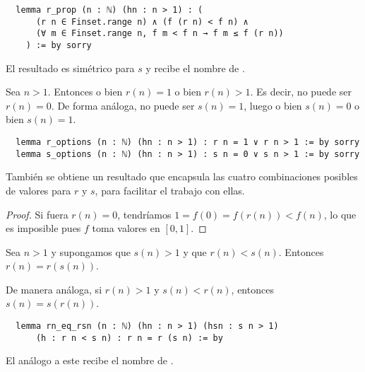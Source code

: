 \begin{lstlisting}
  lemma r_prop (n : ℕ) (hn : n > 1) : (
      (r n ∈ Finset.range n) ∧ (f (r n) < f n) ∧
      (∀ m ∈ Finset.range n, f m < f n → f m ≤ f (r n))
    ) := by sorry
\end{lstlisting}

El resultado es simétrico para $s$ y recibe el nombre de .

\begin{lemma}
  Sea $n > 1$. Entonces o bien $r(n) = 1$ o bien $r(n) > 1$. Es decir, no puede ser $r(n) = 0$. De forma análoga, no puede ser $s(n) = 1$, luego o bien $s(n) = 0$ o bien $s(n) = 1$.
\end{lemma}

\begin{lstlisting}
  lemma r_options (n : ℕ) (hn : n > 1) : r n = 1 ∨ r n > 1 := by sorry
  lemma s_options (n : ℕ) (hn : n > 1) : s n = 0 ∨ s n > 1 := by sorry
\end{lstlisting}

También se obtiene un resultado  que encapsula las cuatro combinaciones posibles de valores para $r$ y $s$, para facilitar el trabajo con ellas.

\begin{proof}
  Si fuera $r(n) = 0$, tendríamos $1 = f(0) = f(r(n)) < f(n)$, lo que es imposible pues $f$ toma valores en $[0, 1]$.
\end{proof}

\begin{lemma}
  Sea $n > 1$ y supongamos que $s(n) > 1$ y que $r(n) < s(n)$. Entonces $r(n) = r(s(n))$.

  De manera análoga, si $r(n) >1$ y $s(n) < r(n)$, entonces $s(n) = s(r(n))$.
\end{lemma}

\begin{lstlisting}
  lemma rn_eq_rsn (n : ℕ) (hn : n > 1) (hsn : s n > 1)
      (h : r n < s n) : r n = r (s n) := by
\end{lstlisting}

El análogo a este recibe el nombre de .

